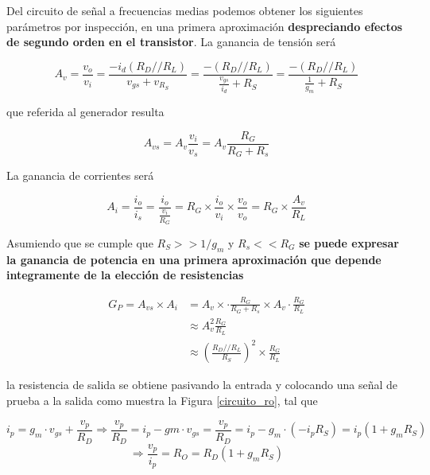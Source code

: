\documentclass[a4paper, 10pt, spanish]{article}
\begin{document}
Del circuito de señal a frecuencias medias podemos obtener los siguientes parámetros por inspección, en una primera aproximación \textbf{despreciando efectos de segundo orden en el transistor}.
La ganancia de tensión será

\begin{equation}
A_v = \frac{v_o}{v_i} = \frac{-i_d(R_D // R_L)}{v_{gs}+ v_{R_S}} = \frac{-(R_D//R_L)}{\frac{v_{gs}}{i_d}+R_S} = \frac{-(R_D//R_L)}{\frac{1}{g_m}+R_S}
\end{equation}

que referida al generador resulta

\begin{equation}
A_{vs} = A_v \frac{v_i}{v_s} = A_v \frac{R_G}{R_G + R_s}
\end{equation}

La ganancia de corrientes será

\begin{equation}
A_i = \frac{i_o}{i_s} = \frac{i_o}{\frac{v_i}{R_G}} = R_G \times \frac{i_o}{v_i} \times \frac{v_o}{v_o}= R_G \times \frac{A_v}{R_L}
\end{equation}

Asumiendo que se cumple que $R_S >> 1/g_m$ y $R_s << R_G$ \textbf{se puede expresar la ganancia de potencia en una primera aproximación que depende integramente de la elección de resistencias}

\begin{align}
G_P = A_{vs}\times A_i &= A_v\times \cdot \frac{R_G}{R_G+R_s} \times A_v \cdot \frac{R_G}{R_L}\\
    &\approx A_v^2 \frac{R_G}{R_L}\\
    &\approx (\frac{R_D//R_L}{R_S})^2 \times \frac{R_G}{R_L}
\end{align}

la resistencia de salida se obtiene pasivando la entrada y colocando una señal de prueba a la salida como muestra la Figura \ref{circuito_ro}, tal que

\begin{equation}
i_p = g_m\cdot v_{gs} + \frac{v_p}{R_D} \Rightarrow \frac{v_p}{R_D} = i_p - gm\cdot v_{gs} = \frac{v_p}{R_D} = i_p - g_m\cdot (-i_p R_S) = i_p (1+g_mR_S) \nonumber
\end{equation}
\begin{equation}
\Rightarrow \frac{v_p}{i_p} = R_O = R_D(1+g_mR_S)
\end{equation}
\end{document}

